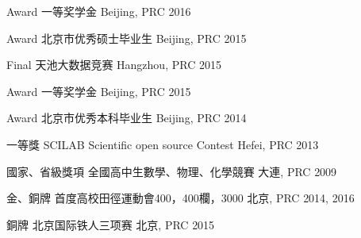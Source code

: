\begin{cvhonors}
\cvhonor
{Award} %
{一等奖学金} %
{Beijing, PRC} %
{2016} %

\cvhonor
{Award} %
{北京市优秀硕士毕业生} %
{Beijing, PRC} %
{2015} %


\cvhonor
{Final} %
{天池大数据竞赛} %
{Hangzhou, PRC} %
{2015} %






\cvhonor
{Award} %
{一等奖学金} %
{Beijing, PRC} %
{2015} %


\cvhonor
{Award} %
{北京市优秀本科毕业生} %
{Beijing, PRC} %
{2014} %



\cvhonor
{一等獎} %
{SCILAB Scientific open source Contest} %
{Hefei, PRC} %
{2013} %


\cvhonor
{國家、省級獎項} %
{全國高中生數學、物理、化學競賽} %
{大連, PRC} %
{2009} %


\cvhonor
{金、銅牌} %
{首度高校田徑運動會400，400欄，3000} %
{北京, PRC} %
{2014, 2016} %

\cvhonor
{銅牌} %
{北京国际铁人三项赛} %
{北京, PRC} %
{2015} %


\end{cvhonors}

